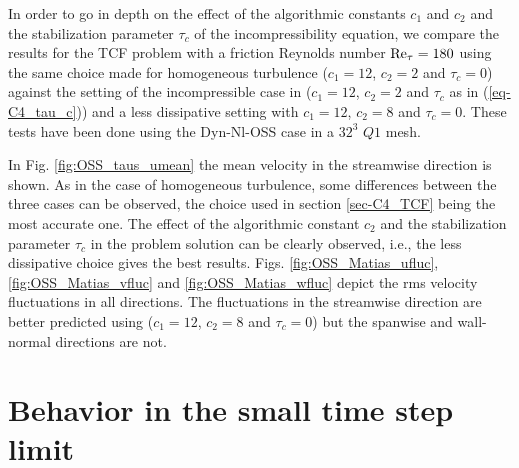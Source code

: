 %
In order to go in depth on the effect of the algorithmic constants $c_1$ and $c_2$ and the stabilization parameter $\tau_c$ of the incompressibility equation, we compare the results for the TCF problem with a friction Reynolds number ${\rm Re}_\tau=180$ using the same choice made for homogeneous turbulence 
($c_1=12$, $c_2=2$ and $\tau_c=0$) against the setting of the incompressible case in \cite{Avila2014} ($c_1=12$, $c_2=2$ and $\tau_c$ as in (\ref{eq-C4_tau_c})) and a less dissipative setting with $c_1=12$, $c_2=8$ and $\tau_c=0$. These tests have been done using the Dyn-Nl-OSS case in a $32^3$ $Q1$ mesh.


In Fig. \ref{fig:OSS_taus_umean} the mean velocity in the streamwise direction is shown. As in the case of homogeneous turbulence, some differences between the three cases can be observed, the choice used in section \ref{sec-C4_TCF} being the most accurate one. The effect of the algorithmic constant $c_2$ and the stabilization parameter $\tau_c$ in the problem solution can be clearly observed, i.e., the less dissipative choice gives the best results.
Figs. \ref{fig:OSS_Matias_ufluc}, \ref{fig:OSS_Matias_vfluc} and \ref{fig:OSS_Matias_wfluc} depict the rms velocity fluctuations in all directions. The fluctuations in the streamwise direction are better predicted using ($c_1=12$, $c_2=8$ and $\tau_c=0$) but the spanwise and wall-normal directions are not.

\section{Behavior in the small time step limit}
\label{sec-C4_small_time_step}

